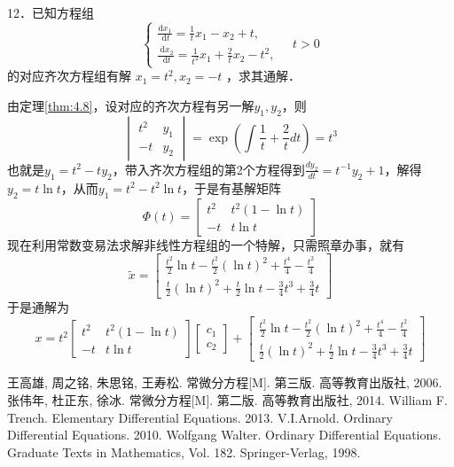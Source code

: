 \begin{exercise}
    12．已知方程组
    $$
        \left\{\begin{array}{l}
            \frac{\mathrm{d} x_1}{\mathrm{~d} t}=\frac{1}{t} x_1-x_2+t, \\
            \frac{\mathrm{~d} x_2}{\mathrm{~d} t}=\frac{1}{t^2} x_1+\frac{2}{t} x_2-t^2,
        \end{array} \quad t>0\right.
    $$
    的对应齐次方程组有解 $x_1=t^2, x_2=-t$ ，求其通解．
\end{exercise}
\begin{solution}
    由定理\ref{thm:4.8}，设对应的齐次方程有另一解$y_1,y_2$，则
    $$
        \begin{vmatrix}
            t^2 & y_1 \\
            -t & y_2
        \end{vmatrix}=\exp\left(\int\frac{1}{t}+\frac{2}{t}dt\right)=t^3
    $$
    也就是$y_1=t^2-ty_2$，带入齐次方程组的第2个方程得到$\frac{dy_2}{dt}=t^{-1}y_2+1$，解得$y_2=t\ln t$，从而$y_1=t^2-t^2\ln t$，于是有基解矩阵
    \[
        \Phi(t)=\begin{bmatrix}
            t^2 & t^2(1-\ln t) \\
            -t & t\ln t
        \end{bmatrix}
    \]
    现在利用常数变易法求解非线性方程组的一个特解，只需照章办事，就有
    $$
        \tilde{x}=\begin{bmatrix}
            \frac{t^2}{2}\ln t-\frac{t^2}{2}(\ln t)^2+\frac{t^4}{4}-\frac{t^2}{4} \\
            \frac{t}{2}(\ln t)^2+\frac{t}{2}\ln t -\frac{3}{4}t^3+\frac{3}{4}t
        \end{bmatrix}
    $$
    于是通解为
    \[
        x=t^2\begin{bmatrix}
            t^2 & t^2(1-\ln t) \\
            -t & t\ln t
        \end{bmatrix}\begin{bmatrix}c_1 \\ c_2\end{bmatrix}+\begin{bmatrix}
            \frac{t^2}{2}\ln t-\frac{t^2}{2}(\ln t)^2+\frac{t^4}{4}-\frac{t^2}{4} \\
            \frac{t}{2}(\ln t)^2+\frac{t}{2}\ln t -\frac{3}{4}t^3+\frac{3}{4}t
        \end{bmatrix}
    \]
\end{solution}



\begin{thebibliography}{99}
     王高雄, 周之铭, 朱思铭, 王寿松. 常微分方程[M]. 第三版. 高等教育出版社, 2006.
     张伟年, 杜正东, 徐冰. 常微分方程[M]. 第二版. 高等教育出版社, 2014.
     William F. Trench. Elementary Differential Equations. 2013.
     V.I.Arnold. Ordinary Differential Equations. 2010.
     Wolfgang Walter. Ordinary Differential Equations. Graduate Texts in Mathematics, Vol. 182. Springer-Verlag, 1998.
\end{thebibliography}

